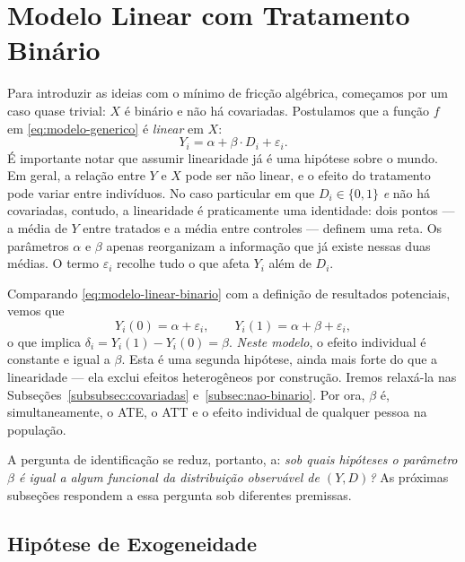 \section{Modelo Linear com Tratamento Binário}
\label{subsec:linear-binario}

Para introduzir as ideias com o mínimo de fricção algébrica, começamos por um caso quase trivial: $X$ é binário e não há covariadas. Postulamos que a função $f$ em \eqref{eq:modelo-generico} é \textit{linear} em $X$:
\begin{equation}
Y_i = \alpha + \beta \cdot D_i + \varepsilon_i.
\label{eq:modelo-linear-binario}
\end{equation}
É importante notar que assumir linearidade já é uma hipótese sobre o mundo. Em geral, a relação entre $Y$ e $X$ pode ser não linear, e o efeito do tratamento pode variar entre indivíduos. No caso particular em que $D_i \in \{0, 1\}$ \textit{e} não há covariadas, contudo, a linearidade é praticamente uma identidade: dois pontos --- a média de $Y$ entre tratados e a média entre controles --- definem uma reta. Os parâmetros $\alpha$ e $\beta$ apenas reorganizam a informação que já existe nessas duas médias. O termo $\varepsilon_i$ recolhe tudo o que afeta $Y_i$ além de $D_i$.

Comparando \eqref{eq:modelo-linear-binario} com a definição de resultados potenciais, vemos que
\begin{equation}
Y_i(0) = \alpha + \varepsilon_i, \qquad Y_i(1) = \alpha + \beta + \varepsilon_i,
\label{eq:potenciais-linear}
\end{equation}
o que implica $\delta_i = Y_i(1) - Y_i(0) = \beta$. \textit{Neste modelo}, o efeito individual é constante e igual a $\beta$. Esta é uma segunda hipótese, ainda mais forte do que a linearidade --- ela exclui efeitos heterogêneos por construção. Iremos relaxá-la nas Subseções~\ref{subsubsec:covariadas} e~\ref{subsec:nao-binario}. Por ora, $\beta$ é, simultaneamente, o ATE, o ATT e o efeito individual de qualquer pessoa na população.

A pergunta de identificação se reduz, portanto, a: \textit{sob quais hipóteses o parâmetro $\beta$ é igual a algum funcional da distribuição observável de $(Y, D)$?} As próximas subseções respondem a essa pergunta sob diferentes premissas.

\subsection{Hipótese de Exogeneidade}
\label{subsubsec:exogeneidade}

